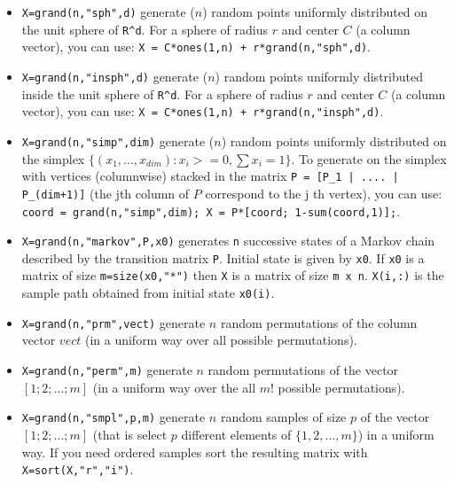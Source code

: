 \begin{description}
\begin{itemize}
\item {}
  \verb!X=grand(n,"sph",d)! generate ($n$) random points uniformly
  distributed on the unit sphere of \verb!R^d!. For a sphere of radius
  $r$ and center $C$ (a column vector), you can use: 
  \verb!X = C*ones(1,n) + r*grand(n,"sph",d)!.
  
\item {}
  \verb!X=grand(n,"insph",d)! generate ($n$) random points uniformly
  distributed inside the unit sphere of \verb!R^d!. For a sphere of radius
  $r$ and center $C$ (a column vector), you can use: 
  \verb!X = C*ones(1,n) + r*grand(n,"insph",d)!.
  
\item {}
  \verb!X=grand(n,"simp",dim)! generate ($n$) random points uniformly
  distributed on the simplex $\{ (x_1,...,x_{dim}): x_i >=0, \sum
  x_i = 1 \}$. To generate on the simplex with vertices (columnwise) 
  stacked in the matrix \verb!P = [P_1 | .... | P_(dim+1)]! (the jth column of $P$ 
  correspond to the j th  vertex), you can use:
  \verb!coord = grand(n,"simp",dim); X = P*[coord; 1-sum(coord,1)];!.
 
\item {} 
  \verb!X=grand(n,"markov",P,x0)! generates \verb!n! successive states of a Markov chain 
  described  by the transition matrix \verb!P!. Initial state is  given by 
  \verb!x0!. If \verb!x0! is a matrix of size \verb!m=size(x0,"*")! 
  then \verb!X! is a matrix of size \verb!m x n!. \verb!X(i,:)! is the sample 
  path  obtained from initial state \verb!x0(i)!.

\item {} \verb!X=grand(n,"prm",vect)! generate $n$ random permutations of the
  column vector $vect$ (in a uniform way over all possible permutations).

\item {}
  \verb!X=grand(n,"perm",m)! generate $n$ random permutations of the
  vector $[1;2;...;m]$ (in a uniform way over the all $m!$ possible permutations).

\item {}
  \verb!X=grand(n,"smpl",p,m)! generate $n$ random samples of size $p$
  of the vector $[1;2;...;m]$ (that is select $p$ different elements
  of $\{1,2,...,m\}$) in a uniform way. If you need ordered samples
  sort the resulting matrix with \verb!X=sort(X,"r","i")!.

\end{itemize}

\end{description}


